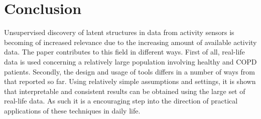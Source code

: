\section{Conclusion}
Unsupervised discovery of latent structures in data from activity sensors is becoming of increased relevance 
due to the increasing amount of available activity data.
The paper contributes to this field in different ways. First of all, real-life data 
is used concerning a relatively large population involving healthy and COPD patients. 
Secondly, the design and usage of tools differs in a number of ways from that reported so far.
Using relatively simple assumptions and settings, it is shown that interpretable and consistent results can be obtained using the 
large set of real-life data. As such it is a encouraging step into the direction of practical applications of these techniques in daily life.

